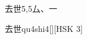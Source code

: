 \begin{entry}{去世}{5,5}{⼛、⼀}
  \begin{phonetics}{去世}{qu4shi4}[][HSK 3]
  \end{phonetics}
\end{entry}
